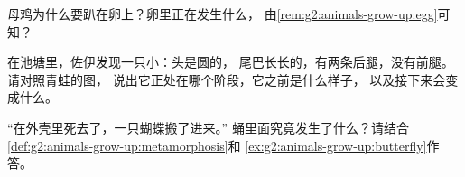 \begin{exercise}[$\star$]\label{exo:g2:animals-grow-up:8}
母鸡为什么要趴在卵上？卵里正在发生什么，
由\cref{rem:g2:animals-grow-up:egg}可知？
\end{exercise}

\begin{exercise}[$\star\star$]\label{exo:g2:animals-grow-up:9}
在池塘里，佐伊发现一只小：头是圆的，
尾巴长长的，有两条后腿，没有前腿。请对照青蛙的图，
说出它正处在哪个阶段，它之前是什么样子，
以及接下来会变成什么。
\end{exercise}

\begin{exercise}[$\star\star$]\label{exo:g2:animals-grow-up:10}
“在外壳里死去了，一只蝴蝶搬了进来。”
蛹里面究竟发生了什么？请结合
\cref{def:g2:animals-grow-up:metamorphosis}和
\cref{ex:g2:animals-grow-up:butterfly}作答。
\end{exercise}

